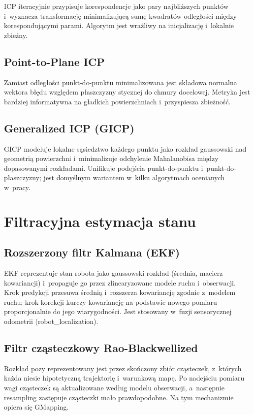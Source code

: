 ICP iteracyjnie przypisuje korespondencje jako pary najbliższych punktów
i~wyznacza transformację minimalizującą sumę kwadratów odległości
między korespondującymi parami.
Algorytm jest wrażliwy na inicjalizację i~lokalnie zbieżny.

\subsection{Point-to-Plane ICP}

Zamiast odległości punkt-do-punktu minimalizowana jest składowa normalna
wektora błędu względem płaszczyzny stycznej do chmury docelowej.
Metryka jest bardziej informatywna na gładkich powierzchniach
i~przyspiesza zbieżność.

\subsection{Generalized ICP (GICP)}

GICP modeluje lokalne sąsiedztwo każdego punktu jako rozkład gaussowski
nad geometrią powierzchni i~minimalizuje odchylenie Mahalanobisa
między dopasowanymi rozkładami.
Unifikuje podejścia punkt-do-punktu i~punkt-do-płaszczyzny;
jest domyślnym wariantem w~kilku algorytmach ocenianych w~pracy.

\section{Filtracyjna estymacja stanu}

\subsection{Rozszerzony filtr Kalmana (EKF)}

EKF reprezentuje stan robota jako gaussowski rozkład (średnia, macierz kowariancji)
i~propaguje go przez zlinearyzowane modele ruchu i~obserwacji.
Krok predykcji przesuwa średnią i~rozszerza kowariancję zgodnie z~modelem ruchu;
krok korekcji kurczy kowariancję na podstawie nowego pomiaru proporcjonalnie
do jego wiarygodności.
Jest stosowany w~fuzji sensorycznej odometrii (robot\_localization).

\subsection{Filtr cząsteczkowy Rao-Blackwellized}

Rozkład pozy reprezentowany jest przez skończony zbiór cząsteczek,
z~których każda niesie hipotetyczną trajektorię i~warunkową mapę.
Po nadejściu pomiaru wagi cząsteczek są aktualizowane według modelu obserwacji,
a~następnie resampling zastępuje cząsteczki mało prawdopodobne.
Na tym mechanizmie opiera się GMapping.

